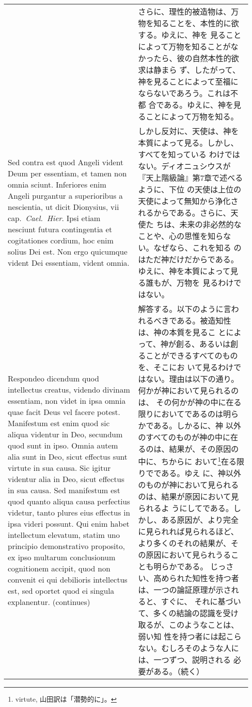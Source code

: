 \documentclass[10pt]{jsarticle} %
\begin{document}
\begin{longtable}{p{21em}p{21em}}
&

さらに、理性的被造物は、万物を知ることを、本性的に欲する。ゆえに、神を
見ることによって万物を知ることがなかったら、彼の自然本性的欲求は静まら
ず、したがって、神を見ることによって至福にならないであろう。これは不都
合である。ゆえに、神を見ることによって万物を知る。

\\

{\sc Sed contra est} quod Angeli vident Deum per essentiam, et tamen
non omnia sciunt. Inferiores enim Angeli purgantur a superioribus a
nescientia, ut dicit Dionysius, {\sc vii} cap.\ {\it Cael.\
Hier}. Ipsi etiam nesciunt futura contingentia et cogitationes
cordium, hoc enim solius Dei est. Non ergo quicumque vident Dei
essentiam, vident omnia.

&

しかし反対に、天使は、神を本質によって見る。しかし、すべてを知っている
わけではない。ディオニュシウスが『天上階級論』第7章で述べるように、下位
の天使は上位の天使によって無知から浄化されるからである。さらに、天使た
ちは、未来の非必然的なことや、心の思惟を知らない。なぜなら、これを知る
のはただ神だけだからである。ゆえに、神を本質によって見る誰もが、万物を
見るわけではない。

\\

{\sc Respondeo dicendum} quod intellectus creatus, videndo divinam
essentiam, non videt in ipsa omnia quae facit Deus vel facere
potest. Manifestum est enim quod sic aliqua videntur in Deo, secundum
quod sunt in ipso. Omnia autem alia sunt in Deo, sicut effectus sunt
virtute in sua causa. Sic igitur videntur alia in Deo, sicut effectus
in sua causa. Sed manifestum est quod quanto aliqua causa perfectius
videtur, tanto plures eius effectus in ipsa videri possunt. Qui enim
habet intellectum elevatum, statim uno principio demonstrativo
proposito, ex ipso multarum conclusionum cognitionem accipit, quod non
convenit ei qui debilioris intellectus est, sed oportet quod ei
singula explanentur. (continues)

&

解答する。以下のように言われるべきである。被造知性は、神の本質を見るこ
とによって、神が創る、あるいは創ることができるすべてのものを、そこにお
いて見るわけではない。理由は以下の通り。何かが神において見られるのは、
その何かが神の中に在る限りにおいてであるのは明らかである。しかるに、神
以外のすべてのものが神の中に在るのは、結果が、その原因の中に、ちからに
おいて\footnote{virtute, 山田訳は「潜勢的に」。}在る限りでである。ゆえ
に、神以外のものが神において見られるのは、結果が原因において見られるよ
うにしてである。しかし、ある原因が、より完全に見られれば見られるほど、
より多くのそれの結果が、その原因において見られうることも明らかである。
じっさい、高められた知性を持つ者は、一つの論証原理が示されると、すぐに、
それに基づいて、多くの結論の認識を受け取るが、このようなことは、弱い知
性を持つ者には起こらない。むしろそのような人には、一つずつ、説明される
必要がある。（続く）


\end{longtable}
\end{document}
